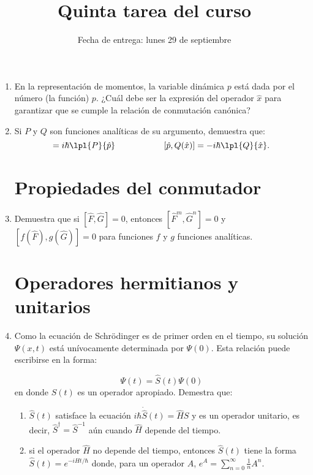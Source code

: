 \documentclass[10pt,letterpaper]{article}
\title{Quinta tarea del curso}
\date{Fecha de entrega: lunes 29 de septiembre}
\begin{document}
\maketitle



\begin{enumerate}
\section*{Representación en el espacio de momentos}
 \item En la representación de momentos, la variable dinámica $p$ está dada por el número (la función) $p$. ¿Cuál debe ser la expresión del operador $\hat{x}$ para garantizar que se cumple la relación de conmutación canónica?

\item Si $P$ y $Q$ son funciones analíticas de su argumento, demuestra que:
\begin{equation*}
[\hat{x},P(\hat{p})] = i\hbar\lpl{P}{\hat{p}}\hspace{2cm}[\hat{p},Q(\hat{x})] = -i\hbar\lpl{Q}{\hat{x}}.
\end{equation*}

\section*{Propiedades del conmutador}

\item Demuestra que si $[\hat{F},\hat{G}]=0$, entonces $[\hat{F}^m,\hat{G}^n]=0$ y $[f(\hat{F}),g(\hat{G})]=0$ para funciones $f$ y $g$ funciones analíticas.

\section*{Operadores hermitianos y unitarios}

\item Como la ecuación de Schrödinger es de primer orden en el tiempo, su solución $\Psi(x,t)$ está unívocamente determinada por  $\Psi(0).$ Esta relación puede escribirse en la forma:

\begin{equation*}
\Psi(t)=\hat{S}(t)\Psi(0)
\end{equation*}
en donde $\hat{S}(t)$ es un operador apropiado. Demestra que:
\begin{enumerate}
\renewcommand{\theenumi}{\Alph{enumi}}
\item $\hat{S}(t)$ satisface la ecuación $i\hbar \dot{\hat{S}}(t) = \hat{H}S$ y es un operador unitario, es decir, $\hat{S}^{\dagger}=\hat{S}^{-1}$ aún cuando $\hat{H}$ depende del tiempo.
\item si el operador $\hat{H}$ no depende del tiempo, entonces $\hat{S}(t)$ tiene la forma $\hat{S}(t) = e^{-i\hat{H}t/\hbar}$ donde, para un operador $A$, $e^A = \sum\limits_{n=0}^\infty \frac{1}{n}A^n$.
\end{enumerate}


\end{enumerate}
\end{document}
